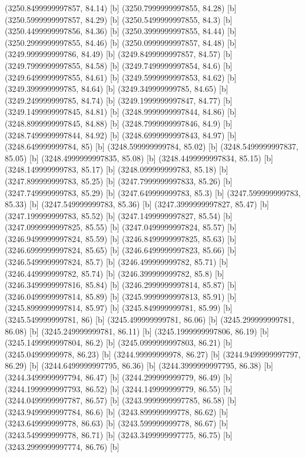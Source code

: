 {{{(3250.8499999997857, 84.14) [b] 
(3250.7999999997855, 84.28) [b] 
(3250.5999999997857, 84.29) [b] 
(3250.5499999997855, 84.3) [b] 
(3250.4499999997856, 84.36) [b] 
(3250.3999999997855, 84.44) [b] 
(3250.2999999997855, 84.46) [b] 
(3250.0999999997857, 84.48) [b] 
(3249.999999999786, 84.49) [b] 
(3249.8499999997857, 84.57) [b] 
(3249.7999999997855, 84.58) [b] 
(3249.7499999997854, 84.6) [b] 
(3249.6499999997855, 84.61) [b] 
(3249.5999999997853, 84.62) [b] 
(3249.399999999785, 84.64) [b] 
(3249.349999999785, 84.65) [b] 
(3249.249999999785, 84.74) [b] 
(3249.1999999997847, 84.77) [b] 
(3249.1499999997845, 84.81) [b] 
(3248.9999999997844, 84.86) [b] 
(3248.8999999997845, 84.88) [b] 
(3248.7999999997846, 84.9) [b] 
(3248.7499999997844, 84.92) [b] 
(3248.6999999997843, 84.97) [b] 
(3248.649999999784, 85) [b] 
(3248.599999999784, 85.02) [b] 
(3248.5499999997837, 85.05) [b] 
(3248.4999999997835, 85.08) [b] 
(3248.4499999997834, 85.15) [b] 
(3248.149999999783, 85.17) [b] 
(3248.099999999783, 85.18) [b] 
(3247.899999999783, 85.25) [b] 
(3247.7999999997833, 85.26) [b] 
(3247.749999999783, 85.29) [b] 
(3247.649999999783, 85.3) [b] 
(3247.599999999783, 85.33) [b] 
(3247.549999999783, 85.36) [b] 
(3247.3999999997827, 85.47) [b] 
(3247.199999999783, 85.52) [b] 
(3247.1499999997827, 85.54) [b] 
(3247.0999999997825, 85.55) [b] 
(3247.0499999997824, 85.57) [b] 
(3246.9499999997824, 85.59) [b] 
(3246.8499999997825, 85.63) [b] 
(3246.6999999997824, 85.65) [b] 
(3246.6499999997823, 85.66) [b] 
(3246.5499999997824, 85.7) [b] 
(3246.499999999782, 85.71) [b] 
(3246.449999999782, 85.74) [b] 
(3246.399999999782, 85.8) [b] 
(3246.3499999997816, 85.84) [b] 
(3246.2999999997814, 85.87) [b] 
(3246.0499999997814, 85.89) [b] 
(3245.9999999997813, 85.91) [b] 
(3245.8999999997814, 85.97) [b] 
(3245.849999999781, 85.99) [b] 
(3245.549999999781, 86) [b] 
(3245.499999999781, 86.06) [b] 
(3245.299999999781, 86.08) [b] 
(3245.249999999781, 86.11) [b] 
(3245.1999999997806, 86.19) [b] 
(3245.1499999997804, 86.2) [b] 
(3245.0999999997803, 86.21) [b] 
(3245.04999999978, 86.23) [b] 
(3244.99999999978, 86.27) [b] 
(3244.9499999997797, 86.29) [b] 
(3244.6499999997795, 86.36) [b] 
(3244.3999999997795, 86.38) [b] 
(3244.3499999997794, 86.47) [b] 
(3244.299999999779, 86.49) [b] 
(3244.1999999997793, 86.52) [b] 
(3244.149999999779, 86.55) [b] 
(3244.0499999997787, 86.57) [b] 
(3243.9999999997785, 86.58) [b] 
(3243.9499999997784, 86.6) [b] 
(3243.899999999778, 86.62) [b] 
(3243.649999999778, 86.63) [b] 
(3243.599999999778, 86.67) [b] 
(3243.549999999778, 86.71) [b] 
(3243.3499999997775, 86.75) [b] 
(3243.2999999997774, 86.76) [b] 
}}}
